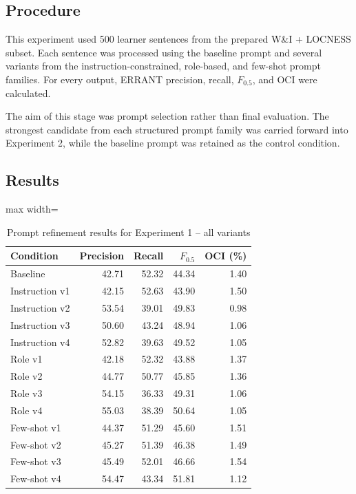 \subsection{Procedure}

This experiment used 500 learner sentences from the prepared W\&I + LOCNESS subset. Each sentence was processed using the baseline prompt and several variants from the instruction-constrained, role-based, and few-shot prompt families. For every output, ERRANT precision, recall, $F_{0.5}$, and OCI were calculated.

The aim of this stage was prompt selection rather than final evaluation. The strongest candidate from each structured prompt family was carried forward into Experiment 2, while the baseline prompt was retained as the control condition.

\subsection{Results}

\begin{table}[htbp]
    \centering
    \caption{Prompt refinement results for Experiment 1 -- all variants}
    \label{tab:exp1_prompt_refinement}
    \renewcommand{\arraystretch}{1.15}
    \begin{adjustbox}{max width=\textwidth}
    \begin{tabular}{lrrrr}
        \toprule
        \textbf{Condition} & \textbf{Precision} & \textbf{Recall} & \textbf{$F_{0.5}$} & \textbf{OCI (\%)} \\
        \midrule
        Baseline       & 42.71 & 52.32 & 44.34 & 1.40 \\
        \addlinespace
        Instruction v1 & 42.15 & 52.63 & 43.90 & 1.50 \\
        Instruction v2 & 53.54 & 39.01 & 49.83 & 0.98 \\
        Instruction v3 & 50.60 & 43.24 & 48.94 & 1.06 \\
        Instruction v4 & 52.82 & 39.63 & 49.52 & 1.05 \\
        \addlinespace
        Role v1        & 42.18 & 52.32 & 43.88 & 1.37 \\
        Role v2        & 44.77 & 50.77 & 45.85 & 1.36 \\
        Role v3        & 54.15 & 36.33 & 49.31 & 1.06 \\
        Role v4        & 55.03 & 38.39 & 50.64 & 1.05 \\
        \addlinespace
        Few-shot v1    & 44.37 & 51.29 & 45.60 & 1.51 \\
        Few-shot v2    & 45.27 & 51.39 & 46.38 & 1.49 \\
        Few-shot v3    & 45.49 & 52.01 & 46.66 & 1.54 \\
        Few-shot v4    & 54.47 & 43.34 & 51.81 & 1.12 \\
        \bottomrule
    \end{tabular}
    \end{adjustbox}
\end{table}

